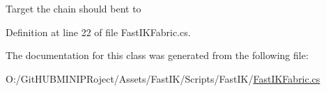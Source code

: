 Target the chain should bent to 



Definition at line 22 of file Fast\+I\+K\+Fabric.\+cs.



The documentation for this class was generated from the following file\+:\begin{DoxyCompactItemize}
\item 
O\+:/\+Git\+H\+U\+B\+M\+I\+N\+I\+P\+Roject/\+Assets/\+Fast\+I\+K/\+Scripts/\+Fast\+I\+K/\mbox{\hyperlink{_fast_i_k_fabric_8cs}{Fast\+I\+K\+Fabric.\+cs}}\end{DoxyCompactItemize}
